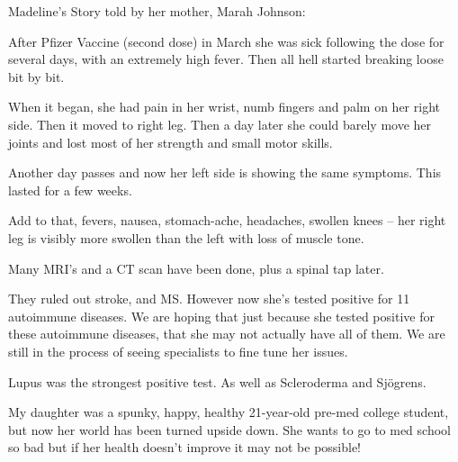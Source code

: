 Madeline’s Story told by her mother, Marah Johnson:

After Pfizer Vaccine (second dose) in March she was sick following the dose for
several days, with an extremely high fever. Then all hell started breaking loose
bit by bit.

When it began, she had pain in her wrist, numb fingers and palm on her right
side. Then it moved to right leg. Then a day later she could barely move her
joints and lost most of her strength and small motor skills.

Another day passes and now her left side is showing the same symptoms. This
lasted for a few weeks.

Add to that, fevers, nausea, stomach-ache, headaches, swollen knees – her right
leg is visibly more swollen than the left with loss of muscle tone.

Many MRI’s and a CT scan have been done, plus a spinal tap later.

They ruled out stroke, and MS. However now she’s tested positive for 11
autoimmune diseases. We are hoping that just because she tested positive for
these autoimmune diseases, that she may not actually have all of them. We are
still in the process of seeing specialists to fine tune her issues.

Lupus was the strongest positive test. As well as Scleroderma and Sjögrens.

My daughter was a spunky, happy, healthy 21-year-old pre-med college student,
but now her world has been turned upside down. She wants to go to med school so
bad but if her health doesn’t improve it may not be possible!

